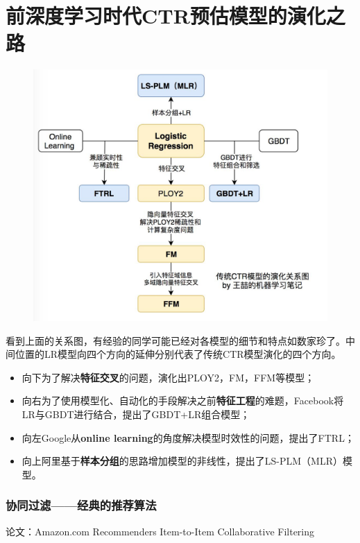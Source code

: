 \documentclass[12pt]{article}
\begin{document}
\part{前深度学习时代CTR预估模型的演化之路}
\begin{figure}[H]
    \centering
    \includegraphics[width=1\textwidth]{fig/Traditional_CTR_Model_Evolution.jpg}
\end{figure}

看到上面的关系图，有经验的同学可能已经对各模型的细节和特点如数家珍了。中间位置的LR模型向四个方向的延伸分别代表了传统CTR模型演化的四个方向。
\begin{itemize}
\setlength{\itemsep}{0pt}
\setlength{\parsep}{0pt}
\setlength{\parskip}{0pt}
    \item 向下为了解决\textbf{特征交叉}的问题，演化出PLOY2，FM，FFM等模型；
    \item 向右为了使用模型化、自动化的手段解决之前\textbf{特征工程}的难题，Facebook将LR与GBDT进行结合，提出了GBDT+LR组合模型；
    \item 向左Google从\textbf{online learning}的角度解决模型时效性的问题，提出了FTRL；
    \item 向上阿里基于\textbf{样本分组}的思路增加模型的非线性，提出了LS-PLM（MLR）模型。
\end{itemize}

\section{协同过滤——经典的推荐算法}
论文：Amazon.com Recommenders Item-to-Item Collaborative Filtering
\end{document}
